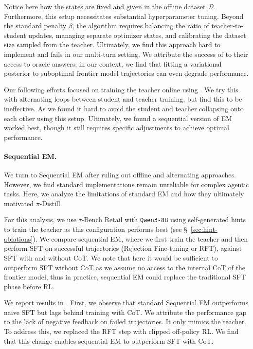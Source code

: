 Notice here how the states are fixed and given in the offline dataset $\mathcal{D}$. Furthermore, this setup necessitates substantial hyperparameter tuning. Beyond the standard penalty $\beta$, the algorithm requires balancing the ratio of teacher-to-student updates, managing separate optimizer states, and calibrating the dataset size sampled from the teacher. Ultimately, we find this approach hard to implement and fails in our multi-turn setting. We attribute the success of \citet{zhou2025variationalreasoninglanguagemodels} to their access to oracle answers; in our context, we find that fitting a variational posterior to suboptimal frontier model trajectories can even degrade performance. 

Our following efforts focused on training the teacher online using .  We try this with alternating loops between student and teacher training, but find this to be ineffective.  As we found it hard to avoid the student and teacher collapsing onto each other using this setup. Ultimately, we found a sequential version of EM worked best, though it still requires specific adjustments to achieve optimal performance.


\paragraph{Sequential EM.}
We turn to Sequential EM after ruling out offline and alternating approaches. However, we find standard implementations remain unreliable for complex agentic tasks. Here, we analyze the limitations of standard EM and how they ultimately motivated $\pi$-Distill.

For this analysis, we use $\tau$-Bench Retail with \texttt{Qwen3-8B} using self-generated hints to train the teacher as this configuration performs best (see \S~\ref{sec:hint-ablations}). We compare sequential EM, where we first train the teacher and then perform SFT on successful trajectories (Rejection Fine-tuning or RFT), against SFT with and without CoT. We note that here it would be sufficient to outperform SFT without CoT as we assume no access to the internal CoT of the frontier model, thus in practice, sequential EM could replace the traditional SFT phase before RL.

We report results in . First, we observe that standard Sequential EM outperforms naive SFT but lags behind training with CoT. We attribute the performance gap to the lack of negative feedback on failed trajectories. It only mimics the teacher. To address this, we replaced the RFT step with clipped off-policy RL. We find that this change enables sequential EM to outperform SFT with CoT.


